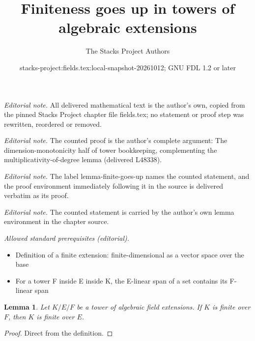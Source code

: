 \documentclass[10pt,a4paper]{amsart}
\title{Finiteness goes up in towers of algebraic extensions}
\author{The Stacks Project Authors}
\date{stacks-project:fields.tex:local-snapshot-20261012; GNU FDL 1.2 or later}
\theoremstyle{plain}
\newtheorem{lemma}[subsection]{Lemma}
\theoremstyle{definition}
\theoremstyle{remark}
\numberwithin{equation}{subsection}
\begin{document}
\maketitle
\noindent\textit{Editorial note.} All delivered mathematical text is the author's own, copied from the pinned Stacks Project chapter file fields.tex; no statement or proof step was rewritten, reordered or removed.\par\medskip
\noindent\textit{Editorial note.} The counted proof is the author's complete argument: The dimension-monotonicity half of tower bookkeeping, complementing the multiplicativity-of-degree lemma (delivered L48338).\par\medskip
\noindent\textit{Editorial note.} The label lemma-finite-goes-up names the counted statement, and the proof environment immediately following it in the source is delivered verbatim as its proof.\par\medskip
\noindent\textit{Editorial note.} The counted statement is carried by the author's own lemma environment in the chapter source.\par\medskip
\noindent\textit{Allowed standard prerequisites (editorial).}\begin{itemize}
\item Definition of a finite extension: finite-dimensional as a vector space over the base
\item For a tower F inside E inside K, the E-linear span of a set contains its F-linear span
\end{itemize}\medskip
\begin{lemma}
\label{lemma-finite-goes-up}
Let $K/E/F$ be a tower of algebraic field extensions.
If $K$ is finite over $F$, then $K$ is finite over $E$.
\end{lemma}

\begin{proof}
Direct from the definition.
\end{proof}
\end{document}
